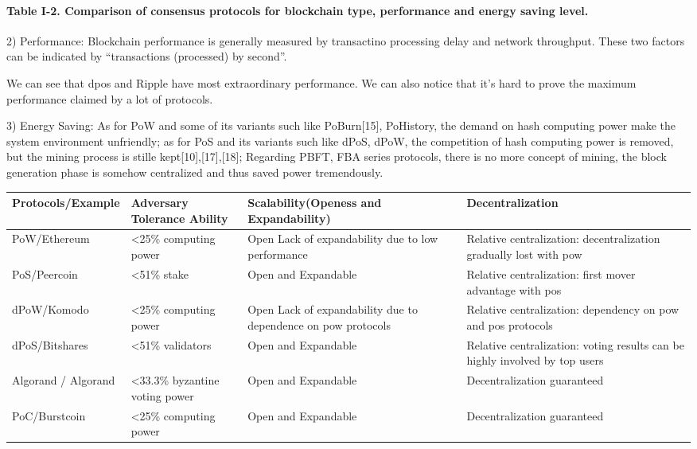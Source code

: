 \documentclass[doublespacing]{bmcart}
\begin{document}
\begin{CJK*}{UTF8}{gbsn}
\paragraph{Table I-2. Comparison of consensus protocols for blockchain type, performance and energy saving level.}


2) Performance: Blockchain performance is generally measured by transactino processing delay and network throughput. These two factors can be indicated by ``transactions (processed) by second''. 

We can see that dpos and Ripple have most extraordinary performance. We can also notice that it's hard to prove the maximum performance claimed by a lot of protocols. 

3)  Energy Saving: As for PoW and some of its variants such like PoBurn[15], PoHistory, the demand on hash computing power make the system environment unfriendly; as for PoS and its variants such like dPoS, dPoW, the competition of hash computing power is removed, but the mining process is stille kept[10],[17],[18];
Regarding PBFT, FBA series protocols, there is no more concept of mining, the block generation phase is somehow centralized and thus saved power tremendously.

\begin{tabular}{p{2cm}p{3cm}p{3cm}p{3cm}}
\hline
Protocols/E\-xample  & 
Adversary Tolerance Ability & 
Scalability(Openess and Expandability) & Decentralization \\ \hline

PoW/Ethe\-reum  & \textless25\% computing power & Open \newline Lack of expandability due to low performance & Relative centralization:  decentralization gradually lost with pow\\ \hline

PoS/Peercoin & 
\textless51\% stake & 
Open and Expandable & 
Relative centralization: first mover advantage with pos\\ \hline

dPoW/Komo\-do  & 
\textless25\% computing power &
  Open  \newline Lack of expandability due to dependence on pow protocols & 
  Relative centralization: dependency on pow and pos protocols \\ \hline
dPoS/\newline Bitshares  & \textless51\% validators & Open and Expandable & Relative centralization: voting results can be highly involved by top users \\ \hline
Algorand / Algorand & \textless33.3\% byzantine voting power & Open and Expandable & Decentralization guaranteed  \\ \hline
PoC/Burst\-coin &
 \textless25\% computing power &
  Open and Expandable &
  Decentralization guaranteed \\ \hline
  

\end{tabular}
\end{CJK*}
\end{document}
